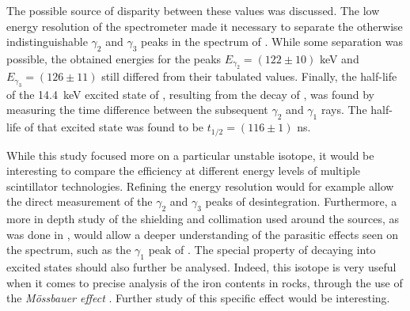 The possible source of disparity between these values was discussed.
The low energy resolution of the spectrometer made it necessary to separate the otherwise indistinguishable $\gamma_2$ and $\gamma_3$ peaks in the spectrum of \cobalt.
While some separation was possible, the obtained energies for the peaks \(E_{\gamma_2} = (122 \pm 10)\) keV and \(E_{\gamma_3} = (126 \pm 11)\) still differed from their tabulated values.
Finally, the half-life of the \mbox{14.4 keV} excited state of \iron, resulting from the decay of \cobalt, was found by measuring the time difference between the subsequent \(\gamma_2\) and \(\gamma_1\) rays.
The half-life of that excited state was found to be \(t_{1/2} = (116 \pm 1)\) ns.

While this study focused more on a particular unstable isotope, it would be interesting to compare the efficiency at different energy levels of multiple scintillator technologies.
Refining the energy resolution would for example allow the direct measurement of the \(\gamma_2\) and \(\gamma_3\) peaks of \cobalt desintegration.
Furthermore, a more in depth study of the shielding and collimation used around the sources, as was done in \cite{smith_evaluation_2008}, would allow a deeper understanding of the parasitic effects seen on the spectrum, such as the \(\gamma_1\) peak of \lead.
The special property of \cobalt decaying into excited \iron states should also further be analysed.
Indeed, this isotope is very useful when it comes to precise analysis of the iron contents in rocks, through the use of the \emph{Mössbauer effect} \cite{klingelhofer_mossbauer_2004}.
Further study of this specific effect would be interesting.